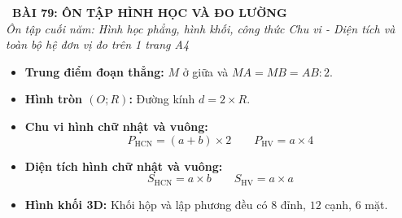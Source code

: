 \documentclass[11pt,a4paper]{article}
\begin{document}
\begin{tcolorbox}[
  enhanced,
  colback=white,
  colframe=primary,
  arc=3mm,
  boxrule=1.2pt,
  left=4mm, right=4mm, top=2.5mm, bottom=2.5mm,
  drop shadow=black!10!white
]
  \centering
  {\Large\bfseries\color{primary}\faBookmark\ BÀI 79: ÔN TẬP HÌNH HỌC VÀ ĐO LƯỜNG}\\[1.5mm]
  {\small\itshape\color{black!75}Ôn tập cuối năm: Hình học phẳng, hình khối, công thức Chu vi - Diện tích và toàn bộ hệ đơn vị đo trên 1 trang A4}
\end{tcolorbox}

\vspace{-2mm}


\noindent
\begin{minipage}[t]{0.49\textwidth}\vspace{0pt}
\begin{tcolorbox}[
  enhanced,
  colback=blue!4!white,
  colframe=blue!75!black,
  arc=2mm, boxrule=0.8pt,
  left=2mm, right=2mm, top=1.8mm, bottom=1.8mm,
  title={\footnotesize\bfseries\color{white}\faKey\ 1. Trọng tâm Hình học lớp 3}
]
{\footnotesize
\begin{itemize}\setlength{\itemsep}{1.5pt}\setlength{\leftskip}{-2.5mm}
  \item \textbf{Trung điểm đoạn thẳng:} $M$ ở giữa và $MA = MB = AB : 2$.
  \item \textbf{Hình tròn $(O; R)$:} Đường kính $d = 2 \times R$.
  \item \textbf{Chu vi hình chữ nhật và vuông:}
  $$P_{\text{HCN}} = (a + b) \times 2 \qquad P_{\text{HV}} = a \times 4$$
  \item \textbf{Diện tích hình chữ nhật và vuông:}
  $$S_{\text{HCN}} = a \times b \qquad S_{\text{HV}} = a \times a$$
  \item \textbf{Hình khối 3D:} Khối hộp và lập phương đều có $8$ đỉnh, $12$ cạnh, $6$ mặt.
\end{itemize}
}
\end{tcolorbox}
\end{minipage}
\hfill
\end{document}
